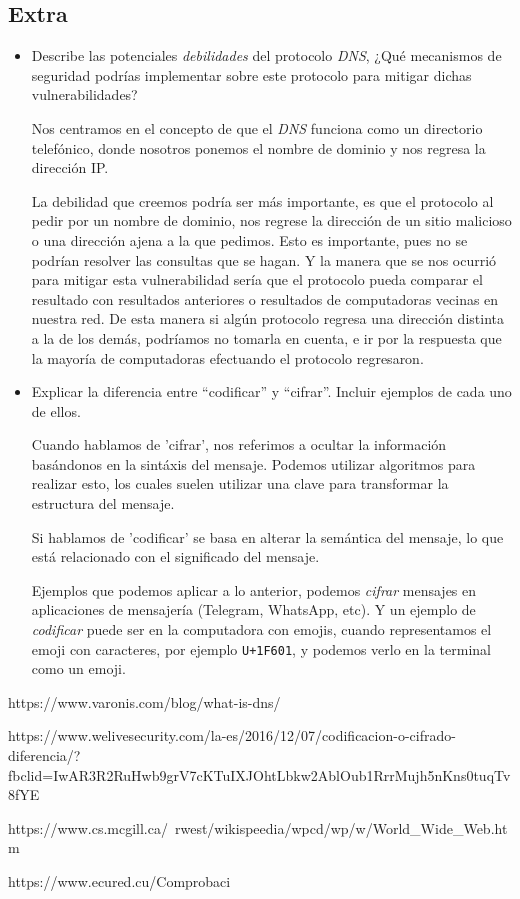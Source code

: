 \documentclass[spanish,12pt,letterpaper]{article}
\begin{document}
\subsection{Extra}
\begin{itemize}
\item Describe las potenciales \textit{debilidades} del protocolo \textit{DNS},
  ¿Qué mecanismos de seguridad podrías implementar sobre este protocolo para
  mitigar dichas vulnerabilidades?

  Nos centramos en el concepto de que el \textit{DNS} funciona como un directorio
  telefónico, donde nosotros ponemos el nombre de dominio y nos regresa la
  dirección IP.

  La debilidad que creemos podría ser más importante, es que el protocolo al
  pedir por un nombre de dominio, nos regrese la dirección de un sitio malicioso
  o una dirección ajena a la que pedimos. Esto es importante, pues no se podrían
  resolver las consultas que se hagan. Y la manera que se nos ocurrió para
  mitigar esta vulnerabilidad sería que el protocolo pueda comparar el resultado
  con resultados anteriores o resultados de computadoras vecinas en nuestra red.
  De esta manera si algún protocolo regresa una dirección distinta a la de los
  demás, podríamos no tomarla en cuenta, e ir por la respuesta que la mayoría de
  computadoras efectuando el protocolo regresaron.

  
\item Explicar la diferencia entre ``codificar'' y ``cifrar''. Incluir ejemplos
  de cada uno de ellos.

  Cuando hablamos de 'cifrar', nos referimos a ocultar la información basándonos
  en la sintáxis del mensaje. Podemos utilizar algoritmos para realizar esto, los
  cuales suelen utilizar una clave para transformar la estructura del mensaje.

  Si hablamos de 'codificar' se basa en alterar la semántica del mensaje, lo que
  está relacionado con el significado del mensaje.

  Ejemplos que podemos aplicar a lo anterior, podemos \textit{cifrar} mensajes en
  aplicaciones de mensajería (Telegram, WhatsApp, etc). Y un ejemplo de \textit{
    codificar} puede ser en la computadora con emojis, cuando representamos el
  emoji con caracteres, por ejemplo \texttt{U+1F601}, y podemos verlo en la
  terminal como un emoji.
\end{itemize}

\begin{thebibliography}{9}
  https://www.varonis.com/blog/what-is-dns/

  https://www.welivesecurity.com/la-es/2016/12/07/codificacion-o-cifrado-diferencia/?fbclid=IwAR3R2RuHwb9grV7cKTuIXJOhtLbkw2AblOub1RrrMujh5nKns0tuqTv8fYE

  https://www.cs.mcgill.ca/~rwest/wikispeedia/wpcd/wp/w/World_Wide_Web.htm

  https://www.ecured.cu/Comprobaci%


\end{thebibliography}
\end{document}
